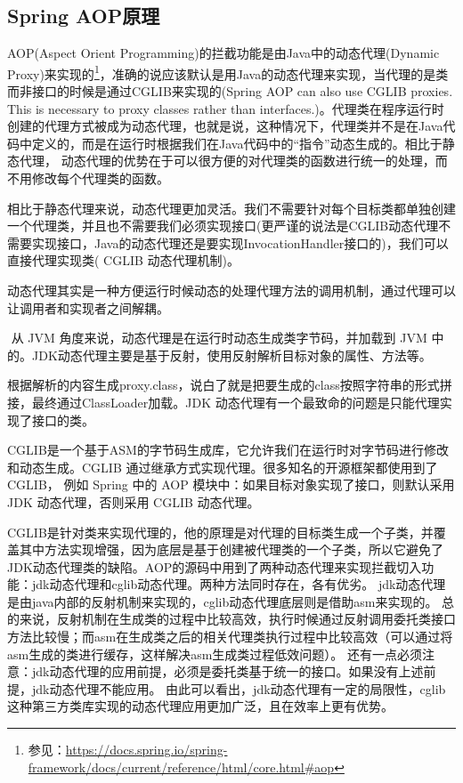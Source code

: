 \documentclass[../../../interview-questions.tex]{subfiles}
\begin{document}
\subsection{Spring AOP原理}

AOP(Aspect Orient Programming)的拦截功能是由Java中的动态代理(Dynamic Proxy)来实现的\footnote{参见：\url{https://docs.spring.io/spring-framework/docs/current/reference/html/core.html\#aop}}，准确的说应该默认是用Java的动态代理来实现，当代理的是类而非接口的时候是通过CGLIB来实现的(Spring AOP can also use CGLIB proxies. This is necessary to proxy classes rather than interfaces.)。代理类在程序运行时创建的代理方式被成为动态代理，也就是说，这种情况下，代理类并不是在Java代码中定义的，而是在运行时根据我们在Java代码中的“指令”动态生成的。相比于静态代理， 动态代理的优势在于可以很方便的对代理类的函数进行统一的处理，而不用修改每个代理类的函数。

​ 相比于静态代理来说，动态代理更加灵活。我们不需要针对每个目标类都单独创建一个代理类，并且也不需要我们必须实现接口(更严谨的说法是CGLIB动态代理不需要实现接口，Java的动态代理还是要实现InvocationHandler接口的)，我们可以直接代理实现类( CGLIB 动态代理机制)。

​ 动态代理其实是一种方便运行时候动态的处理代理方法的调用机制，通过代理可以让调用者和实现者之间解耦。

​ 从 JVM 角度来说，动态代理是在运行时动态生成类字节码，并加载到 JVM 中的。JDK动态代理主要是基于反射，使用反射解析目标对象的属性、方法等。

根据解析的内容生成proxy.class，说白了就是把要生成的class按照字符串的形式拼接，最终通过ClassLoader加载。JDK 动态代理有一个最致命的问题是只能代理实现了接口的类。

​ CGLIB是一个基于ASM的字节码生成库，它允许我们在运行时对字节码进行修改和动态生成。CGLIB 通过继承方式实现代理。很多知名的开源框架都使用到了CGLIB， 例如 Spring 中的 AOP 模块中：如果目标对象实现了接口，则默认采用 JDK 动态代理，否则采用 CGLIB 动态代理。

​ CGLIB是针对类来实现代理的，他的原理是对代理的目标类生成一个子类，并覆盖其中方法实现增强，因为底层是基于创建被代理类的一个子类，所以它避免了JDK动态代理类的缺陷。AOP的源码中用到了两种动态代理来实现拦截切入功能：jdk动态代理和cglib动态代理。两种方法同时存在，各有优劣。 jdk动态代理是由java内部的反射机制来实现的，cglib动态代理底层则是借助asm来实现的。 总的来说，反射机制在生成类的过程中比较高效，执行时候通过反射调用委托类接口方法比较慢；而asm在生成类之后的相关代理类执行过程中比较高效（可以通过将asm生成的类进行缓存，这样解决asm生成类过程低效问题）。 还有一点必须注意：jdk动态代理的应用前提，必须是委托类基于统一的接口。如果没有上述前提，jdk动态代理不能应用。 由此可以看出，jdk动态代理有一定的局限性，cglib这种第三方类库实现的动态代理应用更加广泛，且在效率上更有优势。
\end{document}
